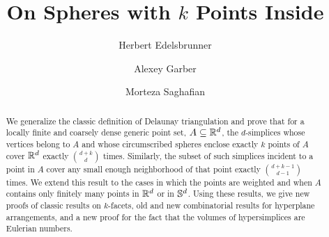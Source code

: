 \documentclass[a4paper,UKenglish,cleveref, autoref,numberwithinsect]{socg-lipics-v2021}
\title{On Spheres with $k$ Points Inside}
\author{Herbert Edelsbrunner}{IST Austria (Institute of Science and Technology Austria), Kloster\-neu\-burg, Austria}{herbert.edelsbrunner@ist.ac.at}{https://orcid.org/0000-0002-9823-6833}{}
\author{Alexey Garber}{School of Mathematical and Statistical Sciences, University of Texas Rio Grande Valley, Brownsville, Texas, USA}{alexey.garber@utrgv.edu}{https://orcid.org/0000-0002-9474-2077}{}
\author{Morteza Saghafian}{IST Austria (Institute of Science and Technology Austria), Kloster\-neu\-burg, Austria}{morteza.saghafian@ist.ac.at}{https://orcid.org/0000-0002-4201-5775}{}
\newcommand {\mm}[1] {\ifmmode{#1}\else{\mbox{\(#1\)}}\fi}
\theoremstyle{plain}
\newcommand{\Rspace}        {\mm{{\mathbb R}}}
\newcommand{\Sspace}        {\mm{{\mathbb S}}}
\begin{document}
\maketitle
\nolinenumbers
\begin{abstract}
  We generalize the classic definition of Delaunay triangulation and prove that for a locally finite and coarsely dense generic point set, $A \subseteq \Rspace^d$,
  the $d$-simplices whose vertices belong to $A$ and whose circumscribed spheres enclose exactly $k$ points of $A$ cover $\Rspace^d$ exactly $\binom{d+k}{d}$ times.
  Similarly, the subset of such simplices incident to a point in $A$ cover any small enough neighborhood of that point exactly $\binom{d+k-1}{d-1}$ times.
  We extend this result to the cases in which the points are weighted and when $A$ contains only finitely many points in $\Rspace^d$ or in $\Sspace^d$.
  Using these results, we give new proofs of classic results on $k$-facets, old and new combinatorial results for hyperplane arrangements, and a new proof for the fact that the volumes of hypersimplices are Eulerian numbers.
\end{abstract}
\end{document}
